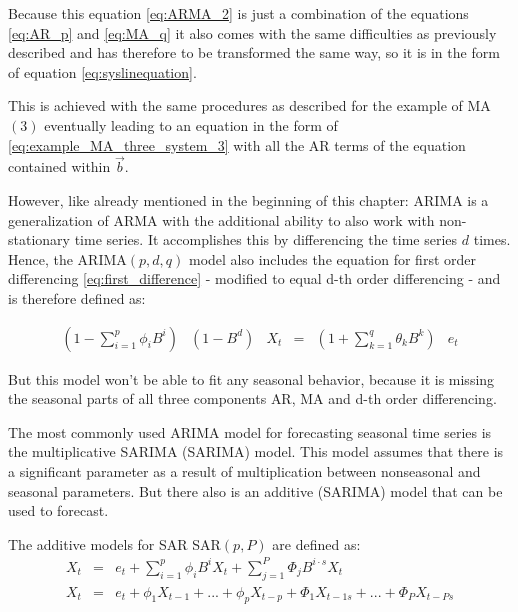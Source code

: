 Because this equation \eqref{eq:ARMA_2} is just a combination of the equations \eqref{eq:AR_p} and \eqref{eq:MA_q} it also comes with the same difficulties as previously described and has therefore to be transformed the same way, so it is in the form of equation \eqref{eq:syslinequation}.

This is achieved with the same procedures as described for the example of \acs{MA}$(3)$ eventually leading to an equation in the form of \eqref{eq:example_MA_three_system_3} with all the \acs{AR} terms of the equation contained within $\vec{b}$.

However, like already mentioned in the beginning of this chapter: \acs{ARIMA} is a generalization of \acs{ARMA} with the additional ability to also work with non-stationary time series. It accomplishes this by differencing the time series $d$ times. Hence, the \acs{ARIMA}$(p,d,q)$ model also includes the equation for first order differencing \eqref{eq:first_difference} - modified to equal d-th order differencing - and is therefore defined as:

\begin{equation}\label{eq:ARIMA_1}
\begin{array}{cccccc}
(1-\displaystyle\sum_{i=1}^{p} \phi_i B^i) & (1-B^d)& X_t & = & (1+\displaystyle\sum_{k=1}^{q} \theta_k B^k) & e_t
\end{array}
\end{equation}

But this model won't be able to fit any seasonal behavior, because it is missing the seasonal parts of all three components \acs{AR}, \acs{MA} and d-th order differencing.

The most commonly used \acs{ARIMA} model for forecasting seasonal time series  is the multiplicative \acl{SARIMA} (\acs{SARIMA}) model. This model assumes that there is a significant parameter as a result of multiplication between nonseasonal and seasonal parameters. But there also is an additive (\acs{SARIMA}) model that can be used to forecast.

The additive models for \acl{SAR} \acs{SAR}$(p,P)$ are defined as:
\begin{equation}\label{eq:additive_SAR_pP}
\begin{array}{rcl}
X_t & = & e_t + \displaystyle\sum_{i=1}^{p} \phi_i B^i X_t + \displaystyle\sum_{j=1}^{P} \Phi_j B^{i\cdot s} X_t\\
X_t & = & e_t + \phi_1 X_{t-1}+ ... + \phi_p X_{t-p} + \Phi_1 X_{t-1 s}+ ... + \Phi_P X_{t-P s}
\end{array}  
\end{equation}

